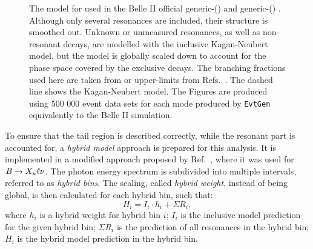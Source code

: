 \begin{figure}[hbtp!]
    \centering
    \caption{\label{fig:generic_Xs_model} The model for \BtoXsgamma used in the Belle II official generic-\Bp () and generic-\Bz () \MC.
    Although only several resonances are included, their structure is smoothed out.
    Unknown or unmeasured resonances, as well as non-resonant decays, are modelled with the inclusive Kagan-Neubert model, but the model is globally scaled down to account for the phase space covered by the exclusive decays.
    The branching fractions used here are taken from  or upper-limits from Refs.~\cite{Workman:2022ynf,Amhis:2022mac}.
    The dashed line shows the Kagan-Neubert model.
    The Figures are produced using 500 000 event data sets for each mode produced by \texttt{EvtGen} equivalently to the Belle II simulation.
    }    
\end{figure}

To ensure that the tail region is described correctly, while the resonant part is accounted for, a \textit{hybrid model} approach is prepared for this analysis.
It is implemented in a modified approach proposed by Ref.~\cite{Ramirez:1989yk}, where it was used for $B\rightarrow X_u\ell\nu$.
The \BtoXsgamma photon energy spectrum is subdivided into multiple intervals, referred to as \textit{hybrid bins}.
The scaling, called \textit{hybrid weight}, instead of being global, is then calculated for each hybrid bin, such that:
\begin{equation}\label{eq:hybrid_model_definition}
    H_i = I_i\cdot h_i + \Sigma R_i,
\end{equation}
where $h_i$ is a hybrid weight for hybrid bin $i$; 
$I_i$ is the inclusive model prediction for the given hybrid bin; 
$\Sigma R_i$ is the prediction of all resonances in the hybrid bin;
$H_i$ is the hybrid model prediction in the hybrid bin.

